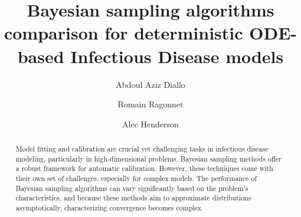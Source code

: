 \documentclass[nonatbib,preprint,12pt,authoryear]{elsarticle}
\begin{document}
\begin{frontmatter}
\title{Bayesian sampling algorithms comparison for deterministic ODE-based Infectious Disease models}


\author[University of Lille]{Abdoul Aziz Diallo}

\author[Monash University]{Romain Ragonnet}

\author[James Cook University]{Alec Henderson}


\begin{abstract}
 Model fitting and calibration are crucial yet challenging tasks in infectious disease modeling, particularly in high-dimensional problems. Bayesian sampling methods offer a robust framework for automatic calibration. However, these techniques come with their own set of challenges, especially for complex models. The performance of Bayesian sampling algorithms can vary significantly based on the problem’s characteristics, and because these methods aim to approximate distributions asymptotically, characterizing convergence becomes complex.


\end{abstract}
\end{frontmatter}
\end{document}
